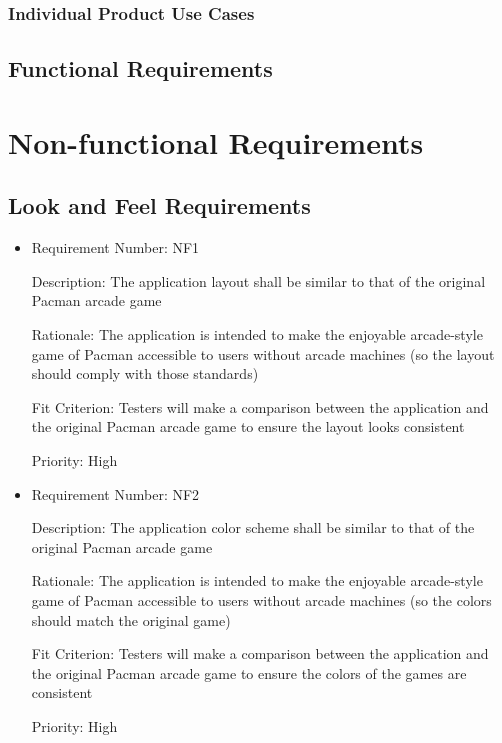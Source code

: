 \documentclass[12pt, titlepage]{article}
\begin{document}
\subsubsection{Individual Product Use Cases}

\subsection{Functional Requirements}

\section{Non-functional Requirements}

\subsection{Look and Feel Requirements}
\begin{itemize}
	\item
	Requirement Number: NF1

	Description: The application layout shall be similar to that of the original Pacman arcade game

	Rationale: The application is intended to make the enjoyable arcade-style game of Pacman accessible to users without arcade machines (so the layout should comply with those standards)

	Fit Criterion: Testers will make a comparison between the application and the original Pacman arcade game to ensure the layout looks consistent

	Priority: High

	\item
	Requirement Number: NF2

	Description: The application color scheme shall be similar to that of the original Pacman arcade game

	Rationale: The application is intended to make the enjoyable arcade-style game of Pacman accessible to users without arcade machines (so the colors should match the original game)

	Fit Criterion: Testers will make a comparison between the application and the original Pacman arcade game to ensure the colors of the games are consistent

	Priority: High
\end{itemize}
\end{document}
